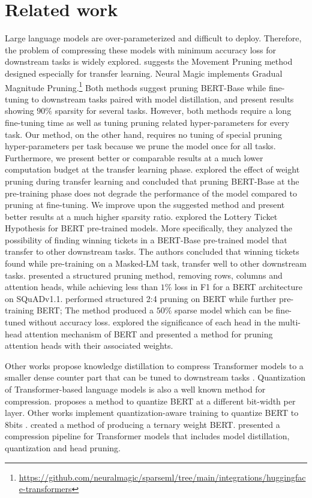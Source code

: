 \documentclass{article}
\begin{document}
\section{Related work}
\label{sec:related}
Large language models are over-parameterized and difficult to deploy. Therefore, the problem of compressing these models with minimum accuracy loss for downstream tasks is widely explored. 
\citet{sanh2020movement} suggests the Movement Pruning method designed especially for transfer learning.
Neural Magic implements Gradual Magnitude Pruning.\footnote{\url{https://github.com/neuralmagic/sparseml/tree/main/integrations/huggingface-transformers}}
Both methods suggest pruning BERT-Base while fine-tuning to downstream tasks paired with model distillation, and present results showing $90\%$ sparsity for several tasks.
However, both methods require a long fine-tuning time as well as tuning pruning related hyper-parameters for every task. 
Our method, on the other hand, requires no tuning of special pruning hyper-parameters  per task because we prune the model once for all tasks.
Furthermore, we present better or comparable results at a much lower computation budget at the transfer learning phase.
\citet{gordon2020pre-train} explored the effect of weight pruning during transfer learning and concluded that pruning BERT-Base at the pre-training phase does not degrade the performance of the model compared to pruning at fine-tuning.
We improve upon the suggested method and present better results at a much higher sparsity ratio.
\citet{chen2020lottery} explored the Lottery Ticket Hypothesis \citep{frankle2018lth} for BERT pre-trained models.
More specifically, they analyzed the possibility of finding winning tickets in a BERT-Base pre-trained model that transfer to other downstream tasks.
The authors concluded that winning tickets found while pre-training on a Masked-LM task, transfer well to other downstream tasks.
\citet{lagunas2021block} presented a structured pruning method, removing rows, columns and attention heads, while achieving less than $1\%$ loss in F1 for a BERT architecture on SQuADv1.1.
\citet{mishra2021nvidia-pre-train} performed structured 2:4 pruning on BERT while further pre-training BERT;
The method produced a $50\%$ sparse model which can be fine-tuned without accuracy loss.
\citet{michel2019heads} explored the significance of each head in the multi-head attention mechanism of BERT and presented a method for pruning attention heads with their associated weights.

Other works propose knowledge distillation to compress Transformer models to a smaller dense counter part that can be tuned to downstream tasks \citep{sanh2019distilbert, jiao2019tinybert, sun2020mobilebert}.
Quantization of Transformer-based language models is also a well known method for compression.
\citet{shen2020qbert} proposes a method to quantize BERT at a different bit-width per layer.
Other works implement quantization-aware training to quantize BERT to 8bits \citep{kim2021ibert, zafrir2019q8bert}.
\citet{zhang2020ternarybert} created a method of producing a ternary weight BERT.
\citet{kim2020fastformers} presented a compression pipeline for Transformer models that includes model distillation, quantization and head pruning.
\end{document}
